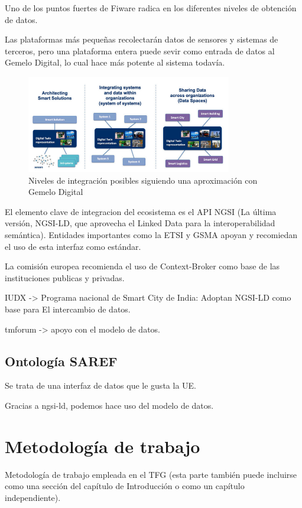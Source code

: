 \documentclass[12pt, a4paper, twoside]{article}
\begin{document}
Uno de los puntos fuertes de Fiware radica en los diferentes niveles de obtención de datos.

Las plataformas más pequeñas recolectarán datos de sensores y sistemas de terceros,
pero una plataforma entera puede sevir como entrada de datos al Gemelo Digital, lo
cual hace más potente al sistema todavía.


\begin{figure}[h]
  \centering
  \includegraphics[width=0.8\textwidth]{digital_twin_levels_integration.png}
  \caption{Niveles de integración posibles siguiendo una aproximación con Gemelo Digital}
\end{figure}

El elemento clave de integracion del ecosistema es el API NGSI 
(La última versión, NGSI-LD, que aprovecha el Linked Data para la 
interoperabilidad semántica). Entidades importantes como
la ETSI y GSMA apoyan y recomiedan el uso de esta interfaz como estándar.

La comisión europea recomienda el uso de Context-Broker como base de las instituciones
publicas y privadas.

IUDX -> Programa nacional de Smart City de India: Adoptan NGSI-LD como base para El
intercambio de datos. 

tmforum  -> apoyo con el modelo de datos.


\subsection{Ontología SAREF}
Se trata de una interfaz de datos que le gusta la UE.

Gracias a ngsi-ld, podemos hace uso del modelo de datos.

\section{Metodología de trabajo}
Metodología de trabajo empleada en el TFG (esta parte también puede incluirse como una sección del capítulo de Introducción o como un capítulo independiente).
\end{document}
